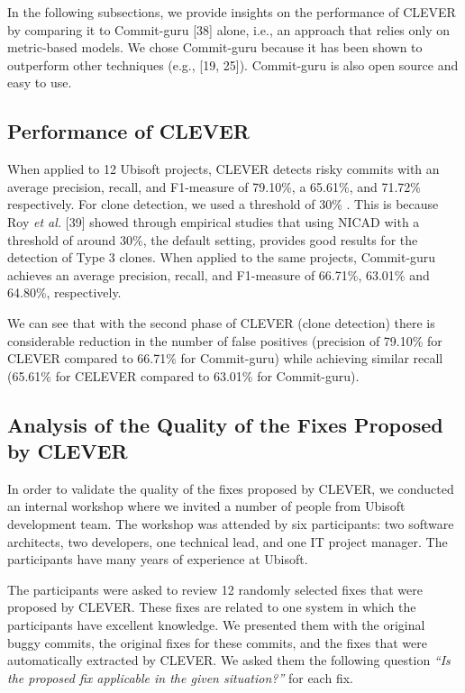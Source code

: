 \documentclass[sigconf]{acmart}
\begin{document}
In the following subsections, we provide insights on the performance of
CLEVER by comparing it to Commit-guru [38] alone, i.e., an approach
that relies only on metric-based models. We chose Commit-guru because it
has been shown to outperform other techniques (e.g., [19, 25]).
Commit-guru is also open source and easy to use.

\subsection{Performance of CLEVER}\label{performance-of-clever}

When applied to 12 Ubisoft projects, CLEVER detects risky commits with
an average precision, recall, and F1-measure of 79.10\%, a 65.61\%, and
71.72\% respectively. For clone detection, we used a threshold of 30\% .
This is because Roy \emph{et al.} [39] showed through empirical
studies that using NICAD with a threshold of around 30\%, the default
setting, provides good results for the detection of Type 3 clones. When
applied to the same projects, Commit-guru achieves an average precision,
recall, and F1-measure of 66.71\%, 63.01\% and 64.80\%, respectively.

We can see that with the second phase of CLEVER (clone detection) there
is considerable reduction in the number of false positives (precision of
79.10\% for CLEVER compared to 66.71\% for Commit-guru) while achieving
similar recall (65.61\% for CELEVER compared to 63.01\% for
Commit-guru).



\subsection{Analysis of the Quality of the Fixes Proposed by
CLEVER}\label{analysis-of-the-quality-of-the-fixes-proposed-by-clever}

In order to validate the quality of the fixes proposed by CLEVER, we
conducted an internal workshop where we invited a number of people from
Ubisoft development team. The workshop was attended by six participants:
two software architects, two developers, one technical lead, and one IT
project manager. The participants have many years of experience at
Ubisoft.

The participants were asked to review 12 randomly selected fixes that
were proposed by CLEVER. These fixes are related to one system in which
the participants have excellent knowledge. We presented them with the
original buggy commits, the original fixes for these commits, and the
fixes that were automatically extracted by CLEVER. We asked them the
following question \emph{``Is the proposed fix applicable in the given
situation?''} for each fix.
\end{document}
